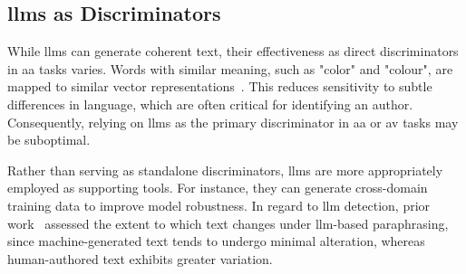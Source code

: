 \subsection{\acsp{llm} as Discriminators}
\label{subsec:llm_discriminator}

While \acp{llm} can generate coherent text, their effectiveness as direct discriminators in \ac{aa} tasks varies. 
Words with similar meaning, such as "color" and "colour", are mapped to similar vector representations~\citep{altakrori_topic_2021}.
This reduces sensitivity to subtle differences in language, which are often critical for identifying an author. 
Consequently, relying on \acp{llm} as the primary discriminator in \ac{aa} or \ac{av} tasks may be suboptimal.

Rather than serving as standalone discriminators, \acp{llm} are more appropriately employed as supporting tools. 
For instance, they can generate cross-domain training data to improve model robustness. 
In regard to \ac{llm} detection, prior work~\citep{mao_raidar_2024} assessed the extent to which text changes under \ac{llm}-based paraphrasing, since machine-generated text tends to undergo minimal alteration, whereas human-authored text exhibits greater variation.
